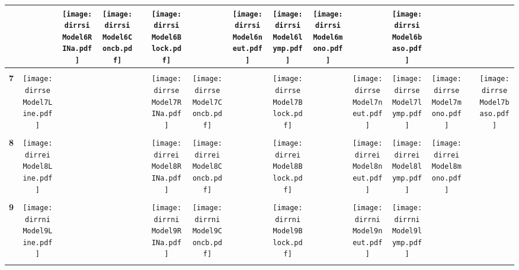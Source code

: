 \documentclass[landscape]{article}
\def \dirrsi{U:/R/RA/Data/RFI-newdata/resultpairedcbc/pvalue05/Model6.Line.RFI.Concb.RINa.neut.lymp.mono.baso.Block/}
\def \dirrse{U:/R/RA/Data/RFI-newdata/resultpairedcbc/pvalue05/Model7.Line.Concb.RINa.neut.lymp.mono.baso.Block/}
\def \dirrei{U:/R/RA/Data/RFI-newdata/resultpairedcbc/pvalue05/Model8.Line.Concb.RINa.neut.lymp.mono.Block/}
\def \dirrni{U:/R/RA/Data/RFI-newdata/resultpairedcbc/pvalue05/Model9.Line.Concb.RINa.neut.lymp.Block/}
\begin{document}
\begin{table}
\begin{tabular}{ccccccccccccccc}
      &
      &\texttt{[image: \\dirrsi Model6RINa.pdf]}
      &\texttt{[image: \\dirrsi Model6Concb.pdf]}
      &
      &\texttt{[image: \\dirrsi Model6Block.pdf]}
      &
      &\texttt{[image: \\dirrsi Model6neut.pdf]}
      &\texttt{[image: \\dirrsi Model6lymp.pdf]}
      &\texttt{[image: \\dirrsi Model6mono.pdf]}
      &
      &\texttt{[image: \\dirrsi Model6baso.pdf]}
     \\[3.5pt]
     \hline
     \\[3.5pt]
     {\Huge \textbf{7}} 
      &\texttt{[image: \\dirrse Model7Line.pdf]}
      &
      &
      &
      &\texttt{[image: \\dirrse Model7RINa.pdf]}
      &\texttt{[image: \\dirrse Model7Concb.pdf]}
      &
      &\texttt{[image: \\dirrse Model7Block.pdf]}
      &
      &\texttt{[image: \\dirrse Model7neut.pdf]}
      &\texttt{[image: \\dirrse Model7lymp.pdf]}
      &\texttt{[image: \\dirrse Model7mono.pdf]}
      &
      &\texttt{[image: \\dirrse Model7baso.pdf]}
     \\[3.5pt]
     \hline
     \\[3.5pt]

     {\Huge \textbf{8}} 
      &\texttt{[image: \\dirrei Model8Line.pdf]}
      &
      &
      &
      &\texttt{[image: \\dirrei Model8RINa.pdf]}
      &\texttt{[image: \\dirrei Model8Concb.pdf]}
      &
      &\texttt{[image: \\dirrei Model8Block.pdf]}
      &
      &\texttt{[image: \\dirrei Model8neut.pdf]}
      &\texttt{[image: \\dirrei Model8lymp.pdf]}
      &\texttt{[image: \\dirrei Model8mono.pdf]}
      &
      &
     \\[3.5pt]
     \hline
     \\[3.5pt]
     
     {\Huge \textbf{9}} 
      &\texttt{[image: \\dirrni Model9Line.pdf]}
      &
      &
      &
      &\texttt{[image: \\dirrni Model9RINa.pdf]}
      &\texttt{[image: \\dirrni Model9Concb.pdf]}
      &
      &\texttt{[image: \\dirrni Model9Block.pdf]}
      &
      &\texttt{[image: \\dirrni Model9neut.pdf]}
      &\texttt{[image: \\dirrni Model9lymp.pdf]}
      &
      &
      &
     \\[3.5pt]
     \hline
     \\[3.5pt]
     
\end{tabular}
\end{table}
\end{document}
